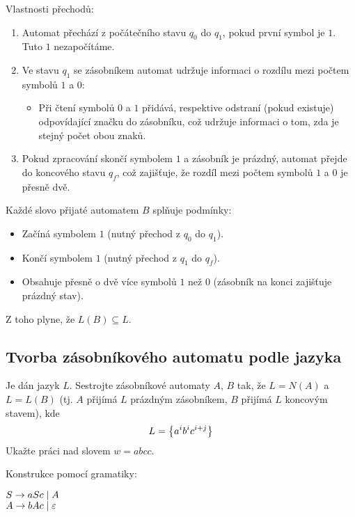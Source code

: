 Vlastnosti přechodů:
\begin{enumerate}[noitemsep]
    \item Automat přechází z počátečního stavu $q_0$ do $q_1$, pokud první symbol je $1$. Tuto $1$ nezapočítáme.
    \item Ve stavu $q_1$ se zásobníkem automat udržuje informaci o rozdílu mezi počtem symbolů $1$ a $0$:
    \begin{itemize}[noitemsep]
        \item Při čtení symbolů $0$ a $1$ přidává, respektive odstraní (pokud existuje) odpovídající značku do zásobníku,
        což udržuje informaci o tom, zda je stejný počet obou znaků.
    \end{itemize}
    \item Pokud zpracování skončí symbolem $1$ a zásobník je prázdný, automat přejde do koncového stavu $q_f$, což 
    zajišťuje, že rozdíl mezi počtem symbolů $1$ a $0$ je přesně dvě.
\end{enumerate}
Každé slovo přijaté automatem $B$ splňuje podmínky:
\begin{itemize}[noitemsep]
    \item Začíná symbolem $1$ (nutný přechod z $q_0$ do $q_1$).
    \item Končí symbolem $1$ (nutný přechod z $q_1$ do $q_f$).
    \item Obsahuje přesně o dvě více symbolů $1$ než $0$ (zásobník na konci zajišťuje prázdný stav).
\end{itemize}
Z toho plyne, že $L(B) \subseteq L$.

\subsection{Tvorba zásobníkového automatu podle jazyka}
Je dán jazyk $L$. Sestrojte zásobníkové automaty $A$, $B$ tak, že $L = N(A)$ a $L = L(B)$ (tj. $A$ přijímá $L$ prázdným 
zásobníkem, $B$ přijímá $L$ koncovým stavem), kde $$L = \left\lbrace a^i b^i c^{i+j} \right\rbrace$$
Ukažte práci nad slovem $w = abcc$. 

Konstrukce pomocí gramatiky: 

$\medskip S \to aSc \mid A$\\
$\medskip A \to bAc \mid \varepsilon$

